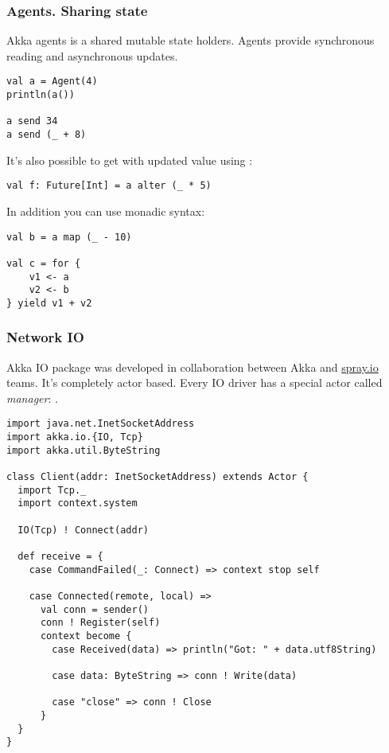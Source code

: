 \begin{frame}[fragile]
\frametitle{Agents. Sharing state}
Akka agents is a shared mutable state holders.  Agents provide synchronous reading and asynchronous updates.
\begin{lstlisting}[name=agents]
val a = Agent(4)
println(a())

a send 34
a send (_ + 8)
\end{lstlisting}
It's also possible to get  with updated value using :
\begin{lstlisting}[name=agents]
val f: Future[Int] = a alter (_ * 5)
\end{lstlisting}
In addition you can use monadic syntax:
\begin{lstlisting}[name=agents]
val b = a map (_ - 10)

val c = for {
    v1 <- a
    v2 <- b
} yield v1 + v2
\end{lstlisting}
\end{frame}

\begin{frame}[fragile]
\frametitle{Network IO}
Akka IO package was developed in collaboration between Akka and \href{http://spray.io}{spray.io} teams.
It's completely actor based. Every IO driver has a special actor called \emph{manager}:
.

\begin{example}
\begin{lstlisting}
import java.net.InetSocketAddress
import akka.io.{IO, Tcp}
import akka.util.ByteString

class Client(addr: InetSocketAddress) extends Actor {
  import Tcp._
  import context.system

  IO(Tcp) ! Connect(addr)

  def receive = {
    case CommandFailed(_: Connect) => context stop self

    case Connected(remote, local) =>
      val conn = sender()
      conn ! Register(self)
      context become {
        case Received(data) => println("Got: " + data.utf8String)

        case data: ByteString => conn ! Write(data)

        case "close" => conn ! Close
      }
  }
}
\end{lstlisting}
\end{example}
\end{frame}


